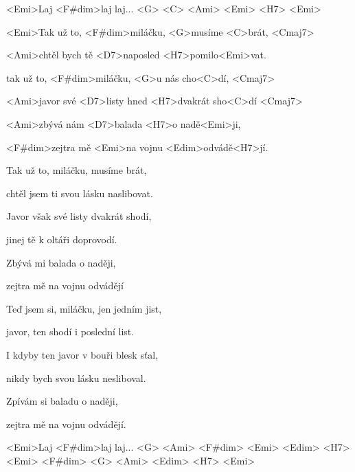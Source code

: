 

 <Emi>Laj <F#dim>laj laj... <G> <C> <Ami> <Emi> <H7> <Emi> 

\zs
<Emi>Tak už to, <F#dim>miláčku, <G>musíme <C>brát, <Cmaj7>

<Ami>chtěl bych tě <D7>naposled <H7>pomilo<Emi>vat.

tak už to, <F#dim>miláčku, <G>u nás cho<C>dí, <Cmaj7>

<Ami>javor své <D7>listy hned <H7>dvakrát sho<C>dí <Cmaj7>

<Ami>zbývá nám <D7>balada <H7>o nadě<Emi>ji,

<F#dim>zejtra mě <Emi>na vojnu <Edim>odvádě<H7>jí. 
\ks

\zs
Tak už to, miláčku, musíme brát,

chtěl jsem ti svou lásku naslibovat.

Javor však své listy dvakrát shodí,

jinej tě k oltáři doprovodí.

Zbývá mi balada o naději,

zejtra mě na vojnu odvádějí 
\ks

\zs
Teď jsem si, miláčku, jen jedním jist,

javor, ten shodí i poslední list.

I kdyby ten javor v bouři blesk sťal,

nikdy bych svou lásku nesliboval.

Zpívám si baladu o naději,

zejtra mě na vojnu odvádějí.
\ks

<Emi>Laj <F#dim>laj laj... <G> <Ami> <F#dim> <Emi> <Edim> <H7> <Emi> <F#dim> <G> <Ami> <Edim> <H7> <Emi> 

\kp
